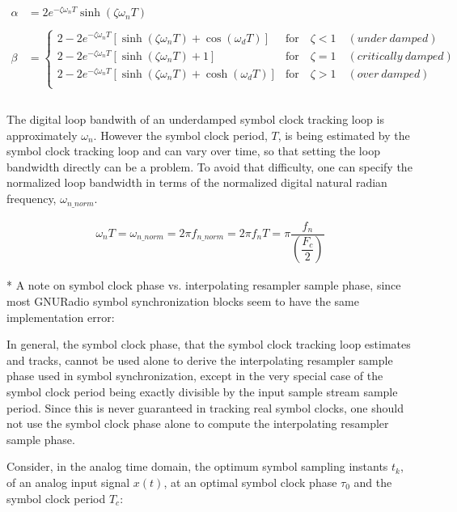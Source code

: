 \documentclass{article}
\begin{document}
\begin{align*}
   \alpha &= 2e^{-\zeta\omega_{n}T} \sinh(\zeta\omega_{n}T) \\
\\
   \beta  &=
      \begin{cases}
         2
         -2e^{-\zeta\omega_{n}T} [\sinh(\zeta\omega_{n}T) + \cos(\omega_{d}T)] &
         \text{for} \quad \zeta < 1 \quad (under \: damped)\\
         2
         -2e^{-\zeta\omega_{n}T} [\sinh(\zeta\omega_{n}T) + 1] &
         \text{for} \quad \zeta = 1 \quad (critically \: damped)\\
         2
         -2e^{-\zeta\omega_{n}T} [\sinh(\zeta\omega_{n}T) +\cosh(\omega_{d}T)] &
         \text{for} \quad \zeta > 1 \quad (over \: damped)\\
      \end{cases} \\
\\
\end{align*}

The digital loop bandwith of an underdamped symbol clock tracking loop is
approximately $\omega_{n}$.  However the symbol clock period, $T$, is being
estimated by the symbol clock tracking loop and can vary over time, so that
setting the loop bandwidth directly can be a problem.  To avoid that difficulty,
one can specify the normalized loop bandwidth in terms of the normalized digital
natural radian frequency, $\omega_{n\_norm}$.

\begin{align*}
    \omega_{n}T = \omega_{n\_norm} = 2 \pi f_{n\_norm} = 2 \pi f_{n} T =
    \pi \dfrac{f_{n}}{\left(\dfrac{F_{c}}{2}\right)}
\end{align*}

* A note on symbol clock phase vs. interpolating resampler sample phase,
since most GNURadio symbol synchronization blocks seem to have the same
implementation error:

In general, the symbol clock phase, that the symbol clock tracking loop
estimates and tracks, cannot be used alone to derive the interpolating resampler
sample phase used in symbol synchronization, except in the very special case of
the symbol clock period being exactly divisible by the input sample stream
sample period.  Since this is never guaranteed in tracking real symbol clocks,
one should not use the symbol clock phase alone to compute the interpolating
resampler sample phase.

Consider, in the analog time domain, the optimum symbol sampling instants
$t_{k}$, of an analog input signal $x(t)$, at an optimal symbol clock
phase $\tau_{0}$ and the symbol clock period $T_{c}$:
\end{document}
